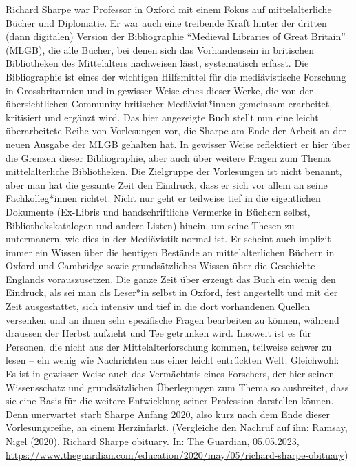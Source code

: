 \documentclass[a4paper,
fontsize=11pt,
oneside,
numbers=noperiodatend,
parskip=half-,
bibliography=totoc,
final
]{scrartcl}
\begin{document}
Richard Sharpe war Professor in Oxford mit einem Fokus auf
mittelalterliche Bücher und Diplomatie. Er war auch eine treibende Kraft
hinter der dritten (dann digitalen) Version der Bibliographie
\enquote{Medieval Libraries of Great Britain} (MLGB), die alle Bücher,
bei denen sich das Vorhandensein in britischen Bibliotheken des
Mittelalters nachweisen lässt, systematisch erfasst. Die Bibliographie
ist eines der wichtigen Hilfsmittel für die mediävistische Forschung in
Grossbritannien und in gewisser Weise eines dieser Werke, die von der
übersichtlichen Community britischer Mediävist*innen gemeinsam
erarbeitet, kritisiert und ergänzt wird. Das hier angezeigte Buch stellt
nun eine leicht überarbeitete Reihe von Vorlesungen vor, die Sharpe am
Ende der Arbeit an der neuen Ausgabe der MLGB gehalten hat. In gewisser
Weise reflektiert er hier über die Grenzen dieser Bibliographie, aber
auch über weitere Fragen zum Thema mittelalterliche Bibliotheken. Die
Zielgruppe der Vorlesungen ist nicht benannt, aber man hat die gesamte
Zeit den Eindruck, dass er sich vor allem an seine Fachkolleg*innen
richtet. Nicht nur geht er teilweise tief in die eigentlichen Dokumente
(Ex-Libris und handschriftliche Vermerke in Büchern selbst,
Bibliothekskatalogen und andere Listen) hinein, um seine Thesen zu
untermauern, wie dies in der Mediävistik normal ist. Er scheint auch
implizit immer ein Wissen über die heutigen Bestände an
mittelalterlichen Büchern in Oxford und Cambridge sowie grundsätzliches
Wissen über die Geschichte Englands vorauszusetzen. Die ganze Zeit über
erzeugt das Buch ein wenig den Eindruck, als sei man als Leser*in selbst
in Oxford, fest angestellt und mit der Zeit ausgestattet, sich intensiv
und tief in die dort vorhandenen Quellen versenken und an ihnen sehr
spezifische Fragen bearbeiten zu können, während draussen der Herbst
aufzieht und Tee getrunken wird. Insoweit ist es für Personen, die nicht
aus der Mittelalterforschung kommen, teilweise schwer zu lesen -- ein
wenig wie Nachrichten aus einer leicht entrückten Welt. Gleichwohl: Es
ist in gewisser Weise auch das Vermächtnis eines Forschers, der hier
seinen Wissensschatz und grundsätzlichen Überlegungen zum Thema so
ausbreitet, dass sie eine Basis für die weitere Entwicklung seiner
Profession darstellen können. Denn unerwartet starb Sharpe Anfang 2020,
also kurz nach dem Ende dieser Vorlesungsreihe, an einem Herzinfarkt.
(Vergleiche den Nachruf auf ihn: Ramsay, Nigel (2020). Richard Sharpe
obituary. In: The Guardian, 05.05.2023,
\url{https://www.theguardian.com/education/2020/may/05/richard-sharpe-obituary})
\end{document}
